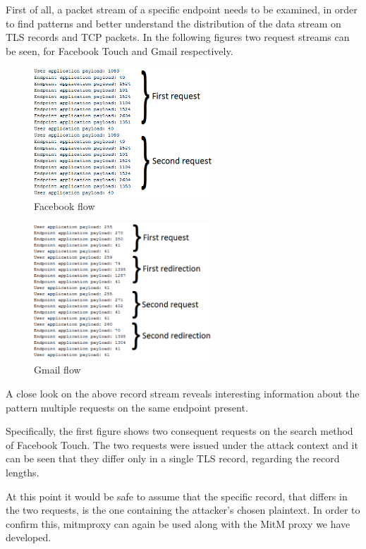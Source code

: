 First of all, a packet stream of a specific endpoint needs to be examined, in
order to find patterns and better understand the distribution of the data stream
on TLS records and TCP packets. In the following figures two request streams can
be seen, for Facebook Touch and Gmail respectively.

\begin{figure}[H] \caption{Facebook flow} \centering
\includegraphics[width=0.6\textwidth]{diagrams/facebook_request_flow.png}\end{figure}

\begin{figure}[H] \caption{Gmail flow} \centering
\includegraphics[width=0.6\textwidth]{diagrams/gmail_request_flow.png}\end{figure}

A close look on the above record stream reveals interesting information about
the pattern multiple requests on the same endpoint present.

Specifically, the first figure shows two consequent requests on the search
method of Facebook Touch. The two requests were issued under the attack context
and it can be seen that they differ only in a single TLS record, regarding the
record lengths.

At this point it would be safe to assume that the specific record, that differs
in the two requests, is the one containing the attacker's chosen plaintext. In
order to confirm this, mitmproxy can again be used along with the MitM proxy we
have developed.

